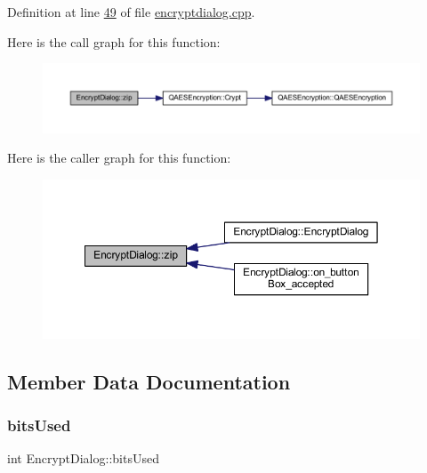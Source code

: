Definition at line \mbox{\hyperlink{encryptdialog_8cpp_source_l00049}{49}} of file \mbox{\hyperlink{encryptdialog_8cpp_source}{encryptdialog.\+cpp}}.

Here is the call graph for this function\+:
\nopagebreak
\begin{figure}[H]
\begin{center}
\leavevmode
\includegraphics[width=350pt]{class_encrypt_dialog_a2bff820a3df4ddc36ecb07ed74b7138a_cgraph}
\end{center}
\end{figure}
Here is the caller graph for this function\+:
\nopagebreak
\begin{figure}[H]
\begin{center}
\leavevmode
\includegraphics[width=350pt]{class_encrypt_dialog_a2bff820a3df4ddc36ecb07ed74b7138a_icgraph}
\end{center}
\end{figure}


\subsection{Member Data Documentation}
\mbox{\label{class_encrypt_dialog_abf638fea37fbdbaba215954e2e239860}} 
\subsubsection{\texorpdfstring{bits\+Used}{bitsUsed}}
{\footnotesize\ttfamily int Encrypt\+Dialog\+::bits\+Used}



